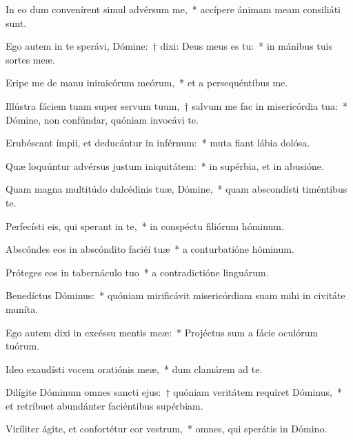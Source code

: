 \item In eo dum convenírent simul advérsum me,~* accípere ánimam meam consiliáti sunt.

\item Ego autem in te sperávi, Dómine:~† dixi: Deus meus es tu:~* in mánibus tuis sortes meæ.

\item Eripe me de manu inimicórum meórum,~* et a persequéntibus me.

\item Illústra fáciem tuam super servum tuum,~† salvum me fac in misericórdia tua:~* Dómine, non confúndar, quóniam invocávi te.

\item Erubéscant ímpii, et deducántur in inférnum:~* muta fiant lábia dolósa.

\item Quæ loquúntur advérsus justum iniquitátem:~* in supérbia, et in abusióne.

\item Quam magna multitúdo dulcédinis tuæ, Dómine,~* quam abscondísti timéntibus te.

\item Perfecísti eis, qui sperant in te,~* in conspéctu filiórum hóminum.

\item Abscóndes eos in abscóndito faciéi tuæ~* a conturbatióne hóminum.

\item Próteges eos in tabernáculo tuo~* a contradictióne linguárum.

\item Benedíctus Dóminus:~* quóniam mirificávit misericórdiam suam mihi in civitáte muníta.

\item Ego autem dixi in excéssu mentis meæ:~* Projéctus sum a fácie oculórum tuórum.

\item Ideo exaudísti vocem oratiónis meæ,~* dum clamárem ad te.

\item Dilígite Dóminum omnes sancti ejus:~† quóniam veritátem requíret Dóminus,~* et retríbuet abundánter faciéntibus supérbiam.

\item Viríliter ágite, et confortétur cor vestrum,~* omnes, qui sperátis in Dómino.

